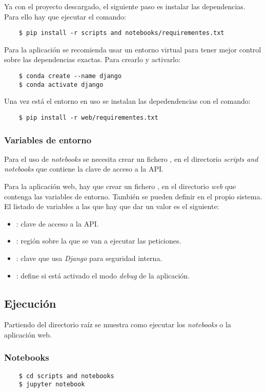 Ya con el proyecto descargado, el siguiente paso es instalar las dependencias. Para ello hay que ejecutar el comando:
\begin{lstlisting}
	$ pip install -r scripts and notebooks/requirementes.txt
\end{lstlisting}
Para la aplicación se recomienda usar un entorno virtual para tener mejor control sobre las dependencias exactas. Para crearlo y activarlo:
\begin{lstlisting}
	$ conda create --name django
	$ conda activate django
\end{lstlisting}
Una vez está el entorno en uso se instalan las depedendencias con el comando:
\begin{lstlisting}
	$ pip install -r web/requirementes.txt
\end{lstlisting}

\subsubsection{Variables de entorno}
Para el uso de \textit{notebooks} se necesita crear un fichero , en el directorio \textit{scripts and notebooks} que contiene la clave de acceso a la API.

Para la aplicación web, hay que crear un fichero , en el directorio \textit{web} que contenga las variables de entorno. También se pueden definir en el propio sistema. El listado de variables a las que hay que dar un valor es el siguiente:
\begin{itemize}
	\item {}: clave de acceso a la API.
	\item {}: región sobre la que se van a ejecutar las peticiones.
	\item {}: clave que usa \textit{Django} para seguridad interna.
	\item {}: define si está activado el modo \textit{debug} de la aplicación.
\end{itemize}

\subsection{Ejecución}
Partiendo del directorio raíz se muestra como ejecutar los \textit{notebooks} o la aplicación web.
\subsubsection{Notebooks}
\begin{lstlisting}
	$ cd scripts and notebooks
	$ jupyter notebook
\end{lstlisting}
